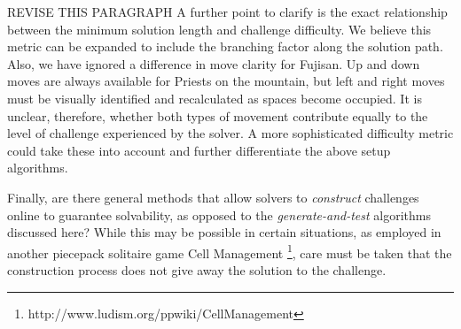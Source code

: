 \documentclass[journal]{IEEEtran}
\begin{document}



REVISE THIS PARAGRAPH
A further point to clarify is the exact relationship between the minimum solution length and challenge difficulty. We believe this metric can be expanded to include the branching factor along the solution path. Also, we have ignored a difference in move clarity for Fujisan. Up and down moves are always available for Priests on the mountain, but left and right moves must be visually identified and recalculated as spaces become occupied. It is unclear, therefore, whether both types of movement contribute equally to the level of challenge experienced by the solver. A more sophisticated difficulty metric could take these into account and further differentiate the above setup algorithms.

Finally, are there general methods that allow solvers to {\it construct} challenges online to guarantee solvability, as opposed to the {\it generate-and-test} algorithms discussed here? While this may be possible in certain situations, as employed in another piecepack solitaire game Cell Management \footnote{http://www.ludism.org/ppwiki/CellManagement}, care must be taken that the construction process does not give away the solution to the challenge.



\end{document}
